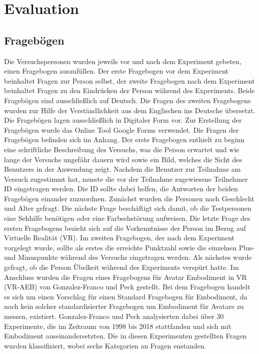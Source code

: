 \chapter{Evaluation}

\section{Fragebögen}
Die Versuchspersonen wurden jeweils vor und nach dem Experiment gebeten, einen Fragebogen auszufüllen. Der erste Fragebogen vor dem Experiment beinhaltet Fragen zur Person selbst, der zweite Fragebogen nach dem Experiment beinhaltet Fragen zu den Eindrücken der Person während des Experiments. Beide Fragebögen sind ausschließlich auf Deutsch. Die Fragen des zweiten Fragebogens wurden zur Hilfe der Verständlichkeit aus dem Englischen ins Deutsche übersetzt. Die Fragebögen lagen ausschließlich in Digitaler Form vor. Zur Erstellung der Fragebögen wurde das Online Tool Google Forms verwendet. Die Fragen der Fragebögen befinden sich im Anhang.
Der erste Fragebogen enthielt zu beginn eine schriftliche Beschreibung des Versuchs, was die Person erwartet und wie lange der Versuchs ungefähr dauern wird sowie ein Bild, welches die Sicht des Benutzers in der Anwendung zeigt. Nachdem die Benutzer zur Teilnahme am Versuch zugestimmt hat, musste die vor der Teilnahme zugewiesene Teilnehmer ID eingetragen werden. Die ID sollte dabei helfen, die Antworten der beiden Fragebögen einander zuzuordnen. Zunächst wurden die Personen nach Geschlecht und Alter gefragt. Die nächste Frage beschäftigt sich damit, ob die Testpersonen eine Sehhilfe benötigen oder eine Farbsehstörung aufweisen. Die letzte Frage des ersten Fragebogens bezieht sich auf die Vorkenntnisse der Person im Bezug auf Virtuelle Realität (VR). 
Im zweiten Fragebogen, der nach dem Experiment vorgelegt wurde, sollte als erstes die erreichte Punktzahl sowie die einzelnen Plus- und Minuspunkte während des Versuchs eingetragen werden. Als nächstes wurde gefragt, ob die Person Übelkeit während des Experiments verspürt hatte.
Im Anschluss wurden die Fragen eines Fragebogens für Avatar Embodiment in VR (VR-AEB) von Gonzalez-Franco und Peck \cite{Gonzalez-Franco2018} gestellt. Bei dem Fragebogen handelt es sich um einen Vorschlag für einen Standard Fragebogen für Embodiment, da noch kein solcher standardisierter Fragebogen um Embodiment für Avatare zu messen, existiert. Gonzalez-Franco und Peck analysierten dabei über 30 Experimente, die im Zeitraum von 1998 bis 2018 stattfanden und sich mit Embodiment auseinandersetzten. Die in diesen Experimenten gestellten Fragen wurden klassifiziert, wobei sechs Kategorien an Fragen enstanden.
